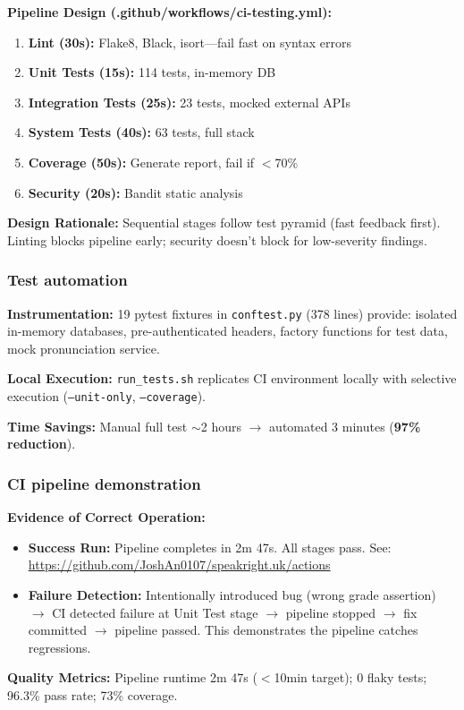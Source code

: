 \documentclass[sigconf]{acmart}
\begin{document}
\textbf{Pipeline Design (.github/workflows/ci-testing.yml):}
\begin{enumerate}[noitemsep]
    \item \textbf{Lint (30s):} Flake8, Black, isort---fail fast on syntax errors
    \item \textbf{Unit Tests (15s):} 114 tests, in-memory DB
    \item \textbf{Integration Tests (25s):} 23 tests, mocked external APIs
    \item \textbf{System Tests (40s):} 63 tests, full stack
    \item \textbf{Coverage (50s):} Generate report, fail if $<$70\%
    \item \textbf{Security (20s):} Bandit static analysis
\end{enumerate}

\textbf{Design Rationale:} Sequential stages follow test pyramid (fast feedback first). Linting blocks pipeline early; security doesn't block for low-severity findings.

\subsubsection{Test automation}

\textbf{Instrumentation:} 19 pytest fixtures in \texttt{conftest.py} (378 lines) provide: isolated in-memory databases, pre-authenticated headers, factory functions for test data, mock pronunciation service.

\textbf{Local Execution:} \texttt{run\_tests.sh} replicates CI environment locally with selective execution (\texttt{--unit-only}, \texttt{--coverage}).

\textbf{Time Savings:} Manual full test $\sim$2 hours $\rightarrow$ automated 3 minutes (\textbf{97\% reduction}).

\subsubsection{CI pipeline demonstration}

\textbf{Evidence of Correct Operation:}
\begin{itemize}[noitemsep]
    \item \textbf{Success Run:} Pipeline completes in 2m 47s. All stages pass. See: \url{https://github.com/JoshAn0107/speakright.uk/actions}
    \item \textbf{Failure Detection:} Intentionally introduced bug (wrong grade assertion) $\rightarrow$ CI detected failure at Unit Test stage $\rightarrow$ pipeline stopped $\rightarrow$ fix committed $\rightarrow$ pipeline passed. This demonstrates the pipeline catches regressions.
\end{itemize}

\textbf{Quality Metrics:} Pipeline runtime 2m 47s ($<$10min target); 0 flaky tests; 96.3\% pass rate; 73\% coverage.
\end{document}
